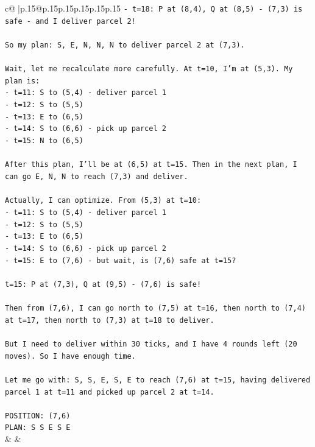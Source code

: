 \documentclass{article}
\begin{document}
{\begin{supertabular}{c@{$\;$}|p{.15\linewidth}@{}p{.15\linewidth}p{.15\linewidth}p{.15\linewidth}p{.15\linewidth}p{.15\linewidth}}
{{{\texttt{{-} t=18: P at (8,4), Q at (8,5) {-} (7,3) is safe {-} and I deliver parcel 2!} \\
\\ 
\texttt{So my plan: S, E, N, N, N to deliver parcel 2 at (7,3).} \\
\\ 
\texttt{Wait, let me recalculate more carefully. At t=10, I'm at (5,3). My plan is:} \\
\texttt{{-} t=11: S to (5,4) {-} deliver parcel 1} \\
\texttt{{-} t=12: S to (5,5)} \\
\texttt{{-} t=13: E to (6,5)} \\
\texttt{{-} t=14: S to (6,6) {-} pick up parcel 2} \\
\texttt{{-} t=15: N to (6,5)} \\
\\ 
\texttt{After this plan, I'll be at (6,5) at t=15. Then in the next plan, I can go E, N, N to reach (7,3) and deliver.} \\
\\ 
\texttt{Actually, I can optimize. From (5,3) at t=10:} \\
\texttt{{-} t=11: S to (5,4) {-} deliver parcel 1} \\
\texttt{{-} t=12: S to (5,5)} \\
\texttt{{-} t=13: E to (6,5)} \\
\texttt{{-} t=14: S to (6,6) {-} pick up parcel 2} \\
\texttt{{-} t=15: E to (7,6) {-} but wait, is (7,6) safe at t=15?} \\
\\ 
\texttt{t=15: P at (7,3), Q at (9,5) {-} (7,6) is safe!} \\
\\ 
\texttt{Then from (7,6), I can go north to (7,5) at t=16, then north to (7,4) at t=17, then north to (7,3) at t=18 to deliver.} \\
\\ 
\texttt{But I need to deliver within 30 ticks, and I have 4 rounds left (20 moves). So I have enough time.} \\
\\ 
\texttt{Let me go with: S, S, E, S, E to reach (7,6) at t=15, having delivered parcel 1 at t=11 and picked up parcel 2 at t=14.} \\
\\ 
\texttt{POSITION: (7,6)} \\
\texttt{PLAN: S S E S E} \\
            }
        }
    }
    & & \\ \\


\end{supertabular}}
\end{document}
